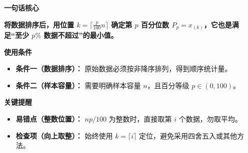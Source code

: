 \begin{summarybox}

	\textbf{\textcolor{CSummary}{一句话核心}}

	\textbf{将数据排序后，用位置 $k=\lceil\frac{p}{100}n\rceil$ 确定第 $p$ 百分位数 $P_p=x_{(k)}$，它也是满足“至少 $p\text{\%}$ 数据不超过”的最小值。}

	\medskip
	\textbf{\textcolor{CSummary}{使用条件}}
	\begin{itemize}[leftmargin=*, itemsep=0.5em, topsep=0.4em]
		\item \textbf{条件一（数据排序）：} 原始数据必须按非降序排列，得到顺序统计量。
		\item \textbf{条件二（样本容量）：} 需要明确样本容量 $n$，且百分等级 $p\in(0,100)$。
	\end{itemize}

	\medskip
	\textbf{\textcolor{CSummary}{关键提醒}}
	\begin{itemize}[leftmargin=*, itemsep=0.5em, topsep=0.4em]
		\item \textbf{易错点（整数位置）：} $np/100$ 为整数时，直接取第 $i$ 个数据，勿取平均。
		\item \textbf{检查项（向上取整）：} 始终使用 $k=\lceil i\rceil$ 定位，避免采用四舍五入或其他方法。
	\end{itemize}
\end{summarybox}
